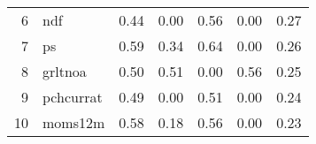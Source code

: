 \documentclass[12pt]{article}
\begin{document}
\begin{footnotesize}
\begin{longtable}{rl|c|c|c|c|c}
				6                    & ndf                         & 0.44                             & 0.00                                                                                          & 0.56                                                                                          & 0.00                                                                                          & 0.27                                                                                                   \\
				7                    & ps                          & 0.59                             & 0.34                                                                                          & 0.64                                                                                          & 0.00                                                                                          & 0.26                                                                                                   \\
				8                    & grltnoa                     & 0.50                             & 0.51                                                                                          & 0.00                                                                                          & 0.56                                                                                          & 0.25                                                                                                   \\
				9                    & pchcurrat                   & 0.49                             & 0.00                                                                                          & 0.51                                                                                          & 0.00                                                                                          & 0.24                                                                                                   \\
				10                   & moms12m                     & 0.58                             & 0.18                                                                                          & 0.56                                                                                          & 0.00                                                                                          & 0.23                                                                                                   \\

\end{longtable}
\end{footnotesize}
\end{document}
